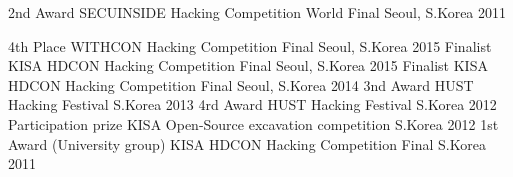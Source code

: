 \begin{cvhonors}
  \cvhonor
    {2nd Award}
    {SECUINSIDE Hacking Competition World Final}
    {Seoul, S.Korea}
    {2011}
\end{cvhonors}

\begin{cvhonors}
  \cvhonor
    {4th Place}
    {WITHCON Hacking Competition Final}
    {Seoul, S.Korea}
    {2015}
  \cvhonor
    {Finalist}
    {KISA HDCON Hacking Competition Final}
    {Seoul, S.Korea}
    {2015}
  \cvhonor
    {Finalist}
    {KISA HDCON Hacking Competition Final}
    {Seoul, S.Korea}
    {2014}
  \cvhonor
    {3nd Award}
    {HUST Hacking Festival}
    {S.Korea}
    {2013}
  \cvhonor
    {4rd Award}
    {HUST Hacking Festival}
    {S.Korea}
    {2012}
  \cvhonor
    {Participation prize}
    {KISA Open-Source excavation competition}
    {S.Korea}
    {2012}
  \cvhonor
    {1st Award (University group)}
    {KISA HDCON Hacking Competition Final}
    {S.Korea}
    {2011}
\end{cvhonors}
